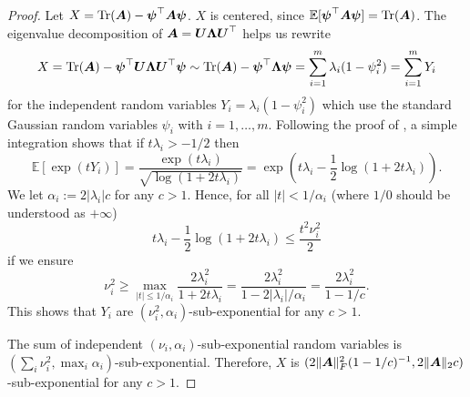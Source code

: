\begin{proof}
    Let $X = \operatorname{Tr}(\boldsymbol{A}) - \boldsymbol{\psi}^{\top} \boldsymbol{A} \boldsymbol{\psi}$. $X$ is centered, since $\mathbb{E}[\boldsymbol{\psi}^{\top} \boldsymbol{A} \boldsymbol{\psi}] = \operatorname{Tr}(\boldsymbol{A})$. The eigenvalue decomposition of $\boldsymbol{A} = \boldsymbol{U} \boldsymbol{\Lambda} \boldsymbol{U}^{\top}$ helps us rewrite
    \begin{equation}
        X = \operatorname{Tr}(\boldsymbol{A}) - \boldsymbol{\psi}^{\top} \boldsymbol{U}\boldsymbol{\Lambda} \boldsymbol{U}^{\top} \boldsymbol{\psi}  \sim \operatorname{Tr}(\boldsymbol{A}) - \boldsymbol{\psi}^{\top} \boldsymbol{\Lambda} \boldsymbol{\psi}  = \sum_{i=1}^{m} \lambda_i (1 - \psi_i^2) = \sum_{i=1}^{m} Y_i
    \end{equation}
    for the independent random variables $Y_i = \lambda_i(1 - \psi_i^2)$ which use the standard Gaussian random variables $\psi_i$ with $i=1, \dots, m$. Following the proof of \cite[Lemma 3]{cortinovis-2022-randomized-trace}, a simple integration shows that if $t \lambda_i > - 1/2$ then
    \begin{equation}
        \mathbb{E}[\exp(t Y_i)] = \frac{\exp\left(t \lambda_i\right) }{\sqrt{\log(1 + 2t \lambda_i)}} = \exp\left(t \lambda_i - \frac{1}{2} \log(1 + 2t \lambda_i) \right).
    \end{equation}
    We let $\alpha_i := 2 |\lambda_i| c$ for any $c > 1$. Hence, for all $|t| < 1 / \alpha_i$ (where $1/0$ should be understood as $+ \infty$)
    \begin{equation}
        t \lambda_i - \frac{1}{2} \log(1 + 2t \lambda_i) \leq \frac{t^2 \nu_i^2}{2}
    \end{equation}
    if we ensure
    \begin{equation}
        \nu_i^2 \geq \max_{|t| \leq 1 / \alpha_i} \frac{2 \lambda_i^2}{1 + 2 t \lambda_i} = \frac{2 \lambda_i^2}{1 - 2 |\lambda_i| / \alpha_i} = \frac{2 \lambda_i^2}{1 - 1 / c}.
    \end{equation}
    This shows that $Y_i$ are $(\nu_i^2, \alpha_i)$-sub-exponential for any $c > 1$.

    The sum of independent $(\nu_i, \alpha_i)$-sub-exponential random variables is $(\sum_i \nu_i^2, \max_i \alpha_i)$-sub-exponential. Therefore, $X$ is $(2 \lVert \boldsymbol{A} \rVert _F^2 (1 - 1/c)^{-1}, 2 \lVert \boldsymbol{A} \rVert _2 c)$-sub-exponential for any $c > 1$.


\end{proof}
